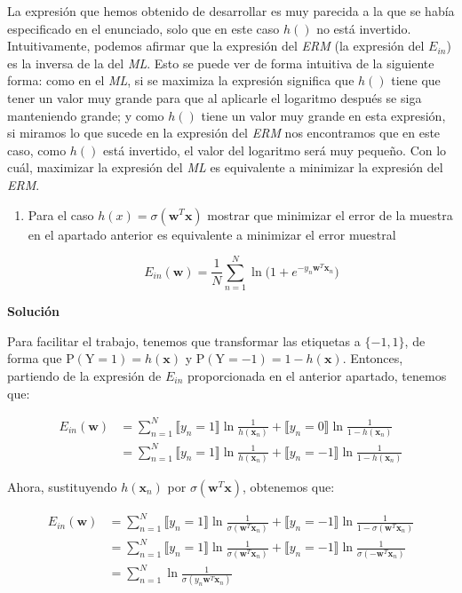 \documentclass[11pt,a4paper]{article}
\newcommand{\answer}{\noindent\textbf{Solución}}
\begin{document}
La expresión que hemos obtenido de desarrollar es muy parecida a la que se había especificado en el enunciado, solo que
en este caso $h()$ no está invertido. Intuitivamente, podemos afirmar que la expresión del \textit{ERM} (la expresión del
$E_{in}$) es la inversa de la del \textit{ML}. Esto se puede ver de forma intuitiva de la siguiente forma: como en el
\textit{ML}, si se maximiza la expresión significa que $h()$ tiene que tener un valor muy grande para que al aplicarle el
logaritmo después se siga manteniendo grande; y como $h()$ tiene un valor muy grande en esta expresión, si miramos lo que
sucede en la expresión del \textit{ERM} nos encontramos que en este caso, como $h()$ está invertido, el valor del logaritmo
será muy pequeño. Con lo cuál, maximizar la expresión del \textit{ML} es equivalente a minimizar la expresión del
\textit{ERM}.

\begin{enumerate}[resume,label=\textit{\alph*})]
	\item Para el caso $h(x) = \sigma (\mathbf{w}^T\mathbf{x})$ mostrar que minimizar el error de la muestra en el apartado
	anterior es equivalente a minimizar el error muestral
	
	\[E_{in}(\mathbf{w}) = \frac{1}{N} \sum_{n=1}^N \ln \bigg( 1 + e^{-y_n\mathbf{w}^T\mathbf{x}_n} \bigg)\]
\end{enumerate}

\answer

Para facilitar el trabajo, tenemos que transformar las etiquetas a $\lbrace -1, 1 \rbrace$, de forma que
$\text{P} (\text{Y} = 1) = h(\mathbf{x})$ y $\text{P} (\text{Y} = -1) = 1 - h(\mathbf{x})$. Entonces, partiendo de la
expresión de $E_{in}$ proporcionada en el anterior apartado, tenemos que:

\begin{equation}
\begin{split}
	E_{in}(\mathbf{w}) &= \sum_{n=1}^N  \llbracket y_n = 1 \rrbracket \ln \frac{1}{h(\mathbf{x}_n)} +
	\llbracket y_n = 0 \rrbracket \ln \frac{1}{1 - h(\mathbf{x}_n)} \\
	&= \sum_{n=1}^N  \llbracket y_n = 1 \rrbracket \ln \frac{1}{h(\mathbf{x}_n)} +
	\llbracket y_n = -1 \rrbracket \ln \frac{1}{1 - h(\mathbf{x}_n)}
\end{split}
\end{equation}

Ahora, sustituyendo $h(\mathbf{x}_n)$ por $\sigma (\mathbf{w}^T\mathbf{x})$, obtenemos que:

\begin{align}
	E_{in}(\mathbf{w}) &= \sum_{n=1}^N  \llbracket y_n = 1 \rrbracket \ln \frac{1}{\sigma (\mathbf{w}^T\mathbf{x}_n)} +
	\llbracket y_n = -1 \rrbracket \ln \frac{1}{1 - \sigma (\mathbf{w}^T\mathbf{x}_n)} \\
	&= \sum_{n=1}^N  \llbracket y_n = 1 \rrbracket \ln \frac{1}{\sigma (\mathbf{w}^T\mathbf{x}_n)} +
	\llbracket y_n = -1 \rrbracket \ln \frac{1}{\sigma (-\mathbf{w}^T\mathbf{x}_n)} \label{sigma_prop} \\
	&= \sum_{n=1}^N  \ln \frac{1}{\sigma (y_n \mathbf{w}^T\mathbf{x}_n)} \label{sigma_y}
\end{align}
\end{document}
